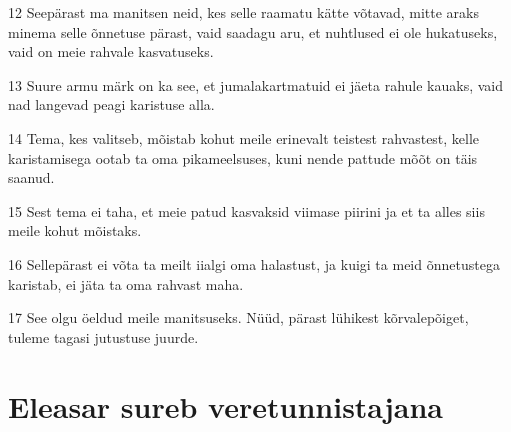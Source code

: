\par 12 Seepärast ma manitsen neid, kes selle raamatu kätte võtavad, mitte araks minema selle õnnetuse pärast, vaid saadagu aru, et nuhtlused ei ole hukatuseks, vaid on meie rahvale kasvatuseks.
\par 13 Suure armu märk on ka see, et jumalakartmatuid ei jäeta rahule kauaks, vaid nad langevad peagi karistuse alla.
\par 14 Tema, kes valitseb, mõistab kohut meile erinevalt teistest rahvastest, kelle karistamisega ootab ta oma pikameelsuses, kuni nende pattude mõõt on täis saanud.
\par 15 Sest tema ei taha, et meie patud kasvaksid viimase piirini ja et ta alles siis meile kohut mõistaks.
\par 16 Sellepärast ei võta ta meilt iialgi oma halastust, ja kuigi ta meid õnnetustega karistab, ei jäta ta oma rahvast maha.
\par 17 See olgu öeldud meile manitsuseks. Nüüd, pärast lühikest kõrvalepõiget, tuleme tagasi jutustuse juurde.


\section*{Eleasar sureb veretunnistajana}

